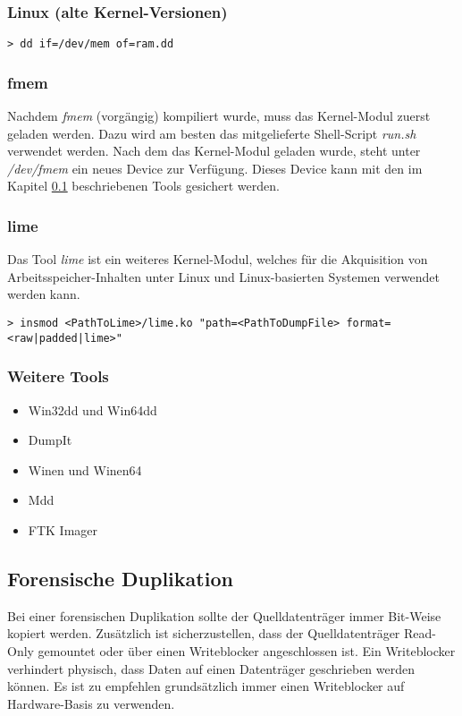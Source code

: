 \subsubsection{Linux (alte Kernel-Versionen)}
\begin{lstlisting}
> dd if=/dev/mem of=ram.dd
\end{lstlisting}

\subsubsection{fmem}
Nachdem \textit{fmem} (vorgängig) kompiliert wurde, muss das Kernel-Modul zuerst geladen werden. Dazu wird am besten das mitgelieferte Shell-Script \textit{run.sh} verwendet werden. Nach dem das Kernel-Modul geladen wurde, steht unter \textit{/dev/fmem} ein neues Device zur Verfügung. Dieses Device kann mit den im Kapitel \ref{subsec:ToolsTechniques:ForensicDuplicate}  beschriebenen Tools gesichert werden.

\subsubsection{lime}
Das Tool \textit{lime} ist ein weiteres Kernel-Modul, welches für die Akquisition von Arbeitsspeicher-Inhalten unter Linux und Linux-basierten Systemen verwendet werden kann.

\begin{lstlisting}
> insmod <PathToLime>/lime.ko "path=<PathToDumpFile> format=<raw|padded|lime>"
\end{lstlisting}

\subsubsection{Weitere Tools}
\begin{itemize}
\item Win32dd und Win64dd
\item DumpIt
\item Winen und Winen64
\item Mdd
\item FTK Imager
\end{itemize}

\subsection{Forensische Duplikation} \label{subsec:ToolsTechniques:ForensicDuplicate}
Bei einer forensischen Duplikation sollte der Quelldatenträger immer Bit-Weise kopiert werden. Zusätzlich ist sicherzustellen, dass der Quelldatenträger Read-Only gemountet oder über einen Writeblocker angeschlossen ist. Ein Writeblocker verhindert physisch, dass Daten auf einen Datenträger geschrieben werden können. Es ist zu empfehlen grundsätzlich immer einen Writeblocker auf Hardware-Basis zu verwenden.

